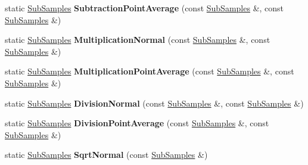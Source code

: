 \begin{DoxyCompactItemize}
\item 
\mbox{\label{classQn_1_1SubSamples_ae5f969d7484f502d506e366d8c80f217}} 
static \mbox{\hyperlink{classQn_1_1SubSamples}{Sub\+Samples}} {\bfseries Subtraction\+Point\+Average} (const \mbox{\hyperlink{classQn_1_1SubSamples}{Sub\+Samples}} \&, const \mbox{\hyperlink{classQn_1_1SubSamples}{Sub\+Samples}} \&)
\item 
\mbox{\label{classQn_1_1SubSamples_aae6533f3cd27ba0e56ceafd83bb5334a}} 
static \mbox{\hyperlink{classQn_1_1SubSamples}{Sub\+Samples}} {\bfseries Multiplication\+Normal} (const \mbox{\hyperlink{classQn_1_1SubSamples}{Sub\+Samples}} \&, const \mbox{\hyperlink{classQn_1_1SubSamples}{Sub\+Samples}} \&)
\item 
\mbox{\label{classQn_1_1SubSamples_a56a4f775c93a6806e48920497d7d2756}} 
static \mbox{\hyperlink{classQn_1_1SubSamples}{Sub\+Samples}} {\bfseries Multiplication\+Point\+Average} (const \mbox{\hyperlink{classQn_1_1SubSamples}{Sub\+Samples}} \&, const \mbox{\hyperlink{classQn_1_1SubSamples}{Sub\+Samples}} \&)
\item 
\mbox{\label{classQn_1_1SubSamples_a66034009bdd2c632067dab4cd5e691f7}} 
static \mbox{\hyperlink{classQn_1_1SubSamples}{Sub\+Samples}} {\bfseries Division\+Normal} (const \mbox{\hyperlink{classQn_1_1SubSamples}{Sub\+Samples}} \&, const \mbox{\hyperlink{classQn_1_1SubSamples}{Sub\+Samples}} \&)
\item 
\mbox{\label{classQn_1_1SubSamples_a0e02a2f2f5797f09886b17ff7e543b18}} 
static \mbox{\hyperlink{classQn_1_1SubSamples}{Sub\+Samples}} {\bfseries Division\+Point\+Average} (const \mbox{\hyperlink{classQn_1_1SubSamples}{Sub\+Samples}} \&, const \mbox{\hyperlink{classQn_1_1SubSamples}{Sub\+Samples}} \&)
\item 
\mbox{\label{classQn_1_1SubSamples_ad659cf796660c8bde8df44d584969228}} 
static \mbox{\hyperlink{classQn_1_1SubSamples}{Sub\+Samples}} {\bfseries Sqrt\+Normal} (const \mbox{\hyperlink{classQn_1_1SubSamples}{Sub\+Samples}} \&)
\item 
\mbox{\label{classQn_1_1SubSamples_aed7c898a0cf4e5349301c000f530949b}} 

\end{DoxyCompactItemize}
